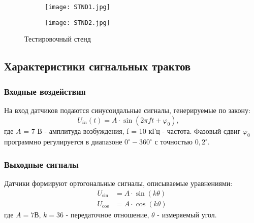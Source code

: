 \begin{figure}[!h]
  \centering
  \begin{subfigure}[b]{0.6\textwidth}
    \centering
    \texttt{[image: STND1.jpg]} 
    \label{STND1}
  \end{subfigure}
  \hfill
  \begin{subfigure}[b]{0.35\textwidth}
    \centering
    \texttt{[image: STND2.jpg]} 
    \label{STND2}
  \end{subfigure}

  \caption{Тестировочный стенд}
  \label{STND} 
\end{figure}


\subsection{Характеристики сигнальных трактов}
\subsubsection{Входные воздействия}
На вход датчиков подаются синусоидальные сигналы, генерируемые по закону: %
\begin{equation}
    U_{in}(t) = A \cdot \sin(2\pi f t + \varphi_0), \quad 
\end{equation}
где $A$ = 7 В - амплитуда возбуждения, f = 10 кГц - частота.
Фазовый сдвиг $\varphi_0$ программно регулируется в диапазоне $0^\circ - 360^\circ$ с точностью $0,2^\circ$.

\subsubsection{Выходные сигналы}
Датчики формируют ортогональные сигналы, описываемые уравнениями:
\begin{align}
    U_{\sin} &= A \cdot \sin(k\theta) \\
    U_{\cos} &= A \cdot \cos(k\theta)
\end{align}
где $A = 7$В, $k=36$ - передаточное отношение, $\theta$ - измеряемый угол.










